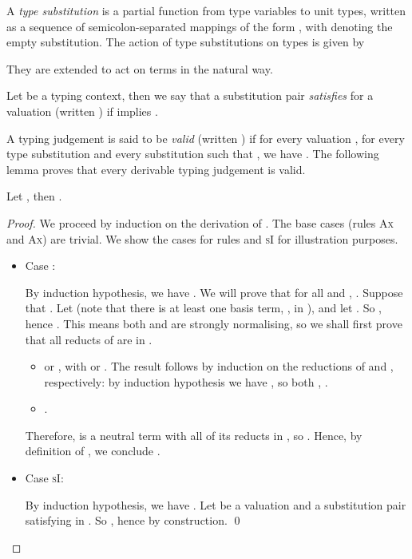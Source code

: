A \emph{type substitution}  is a partial function from type
variables to unit types, written as a sequence of semicolon-separated
mappings of the form , with  denoting the
empty substitution. The action of type substitutions on types is given by

They are extended to act on terms in the natural way.

Let  be a typing context, then we say that a substitution pair
 \emph{satisfies}  for a valuation  (written
) if  implies
.

A typing judgement  is said to be
\emph{valid} (written ) if for every
valuation , for every type substitution  and every
substitution  such that , we have
.
The following lemma proves that every derivable typing judgement is valid.

\begin{lemma}\label{adequacyLemma}
  Let , then .
\end{lemma}

\begin{proof}
  We proceed by induction on the derivation of . The base cases (rules \textsc{Ax} and \textsc{Ax})
  are trivial. We show the cases for rules  and \textsc{sI} for
  illustration purposes.  

\begin{itemize}
\item Case : 

  By induction hypothesis, we have . We
  will prove that for all  and
  , . Suppose that . Let
   (note that there is at least one basis
  term, , in ), and let . So , hence
  . This means both  and
   are strongly normalising, so we shall first prove
  that all reducts of  are in
  .

    \begin{itemize}
    \item  or , with
       or .  The result
      follows by induction on the reductions of  and
      , respectively: by induction hypothesis we
      have , so both , .

    \item .
    \end{itemize}

    Therefore,  is a neutral
    term with all of its reducts in , so  . Hence, by
    definition of , we conclude .

\item Case \textsc{sI}:
  

  By induction hypothesis, we have .  Let
   be a valuation and  a
  substitution pair satisfying  in . So
  , hence
   by construction. \qed
\end{itemize}
\end{proof}

